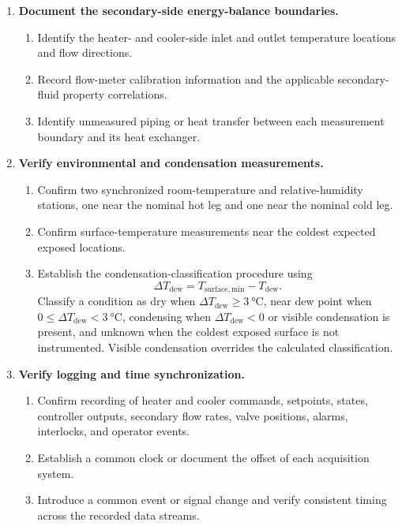 \documentclass[11pt]{article}
\begin{document}
\begin{enumerate}
    \item \textbf{Document the secondary-side energy-balance boundaries.}
    \begin{enumerate}
        \item Identify the heater- and cooler-side inlet and outlet temperature locations and flow directions.
        \item Record flow-meter calibration information and the applicable secondary-fluid property correlations.
        \item Identify unmeasured piping or heat transfer between each measurement boundary and its heat exchanger.
    \end{enumerate}

    \item \textbf{Verify environmental and condensation measurements.}
    \begin{enumerate}
        \item Confirm two synchronized room-temperature and relative-humidity stations, one near the nominal hot leg and one near the nominal cold leg.
        \item Confirm surface-temperature measurements near the coldest expected exposed locations.
        \item Establish the condensation-classification procedure using
        \begin{equation}
            \Delta T_{\mathrm{dew}}
            =
            T_{\mathrm{surface,min}}-T_{\mathrm{dew}}.
        \end{equation}
        Classify a condition as dry when $\Delta T_{\mathrm{dew}}\geq\SI{3}{\degreeCelsius}$, near dew point when $0\leq\Delta T_{\mathrm{dew}}<\SI{3}{\degreeCelsius}$, condensing when $\Delta T_{\mathrm{dew}}<0$ or visible condensation is present, and unknown when the coldest exposed surface is not instrumented. Visible condensation overrides the calculated classification.
    \end{enumerate}

    \item \textbf{Verify logging and time synchronization.}
    \begin{enumerate}
        \item Confirm recording of heater and cooler commands, setpoints, states, controller outputs, secondary flow rates, valve positions, alarms, interlocks, and operator events.
        \item Establish a common clock or document the offset of each acquisition system.
        \item Introduce a common event or signal change and verify consistent timing across the recorded data streams.
    \end{enumerate}


\end{enumerate}
\end{document}
